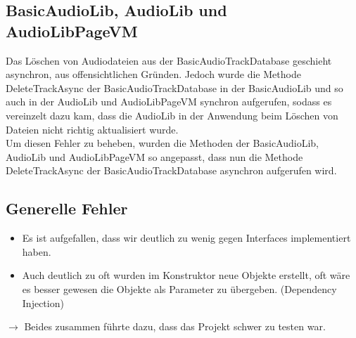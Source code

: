 \documentclass[../validierung.tex]{subfiles}
\begin{document}
	\subsection{BasicAudioLib, AudioLib und AudioLibPageVM}
		Das Löschen von Audiodateien aus der BasicAudioTrackDatabase geschieht asynchron, aus offensichtlichen Gründen. Jedoch wurde die Methode
		DeleteTrackAsync der BasicAudioTrackDatabase in der BasicAudioLib und so auch in der AudioLib und AudioLibPageVM synchron aufgerufen, sodass es
		vereinzelt dazu kam, dass die AudioLib in der Anwendung beim Löschen von Dateien nicht richtig aktualisiert wurde.\\ Um diesen Fehler zu beheben,
		wurden die Methoden der BasicAudioLib, AudioLib und AudioLibPageVM so angepasst, dass nun die Methode DeleteTrackAsync der BasicAudioTrackDatabase
		asynchron aufgerufen wird.

	\subsection{Generelle Fehler}
		\begin{itemize}
			\item Es ist aufgefallen, dass wir deutlich zu wenig gegen Interfaces implementiert haben.
			\item Auch deutlich zu oft wurden im Konstruktor neue Objekte erstellt, oft wäre es besser gewesen die Objekte als Parameter zu übergeben. (Dependency Injection)
		\end{itemize}
		$\rightarrow$ Beides zusammen führte dazu, dass das Projekt schwer zu testen war.
\end{document}
